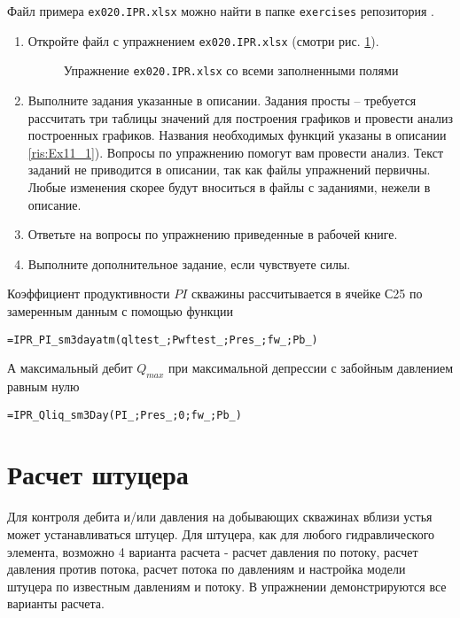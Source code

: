 Файл примера \texttt{ex020.IPR.xlsx} можно найти в папке \texttt{exercises} репозитория \unf{}.

\begin{enumerate}
	
	\item Откройте файл с упражнением \texttt{ex020.IPR.xlsx} (смотри рис. \ref{ris:Ex20_1}).
	
		\begin{figure}[h!]
			\center{\texttt{[image: Ex20\_1]}}
			\caption{Упражнение \texttt{ex020.IPR.xlsx} со всеми заполненными полями }
			\label{ris:Ex20_1}
		\end{figure}

	\item Выполните задания указанные в описании. Задания просты -- требуется рассчитать три таблицы значений для построения графиков и провести анализ построенных графиков. Названия необходимых функций указаны в описании  \ref{ris:Ex11_1}). Вопросы по упражнению помогут вам провести анализ. Текст заданий не приводится в описании, так как файлы упражнений первичны. Любые изменения скорее будут вноситься в файлы с заданиями, нежели в описание.
	
	\item Ответьте на вопросы по упражнению приведенные в рабочей книге.
	
	\item Выполните дополнительное задание, если чувствуете силы.

\end{enumerate}

Коэффициент продуктивности $PI$ скважины рассчитывается в ячейке С25 по замеренным данным  с помощью функции

{ \small  \texttt{=IPR\_PI\_sm3dayatm(qltest\_;Pwftest\_;Pres\_;fw\_;Pb\_)}}

А максимальный дебит $Q_{max}$ при максимальной депрессии с забойным давлением равным нулю

{ \small  \texttt{=IPR\_Qliq\_sm3Day(PI\_;Pres\_;0;fw\_;Pb\_)}}




\section{Расчет штуцера}

Для контроля дебита и/или давления на добывающих скважинах вблизи устья может устанавливаться штуцер. Для штуцера, как для любого гидравлического элемента, возможно 4 варианта расчета - расчет давления по потоку, расчет давления против потока, расчет потока по давлениям и настройка модели штуцера по известным давлениям и потоку. В упражнении демонстрируются все варианты расчета. 

